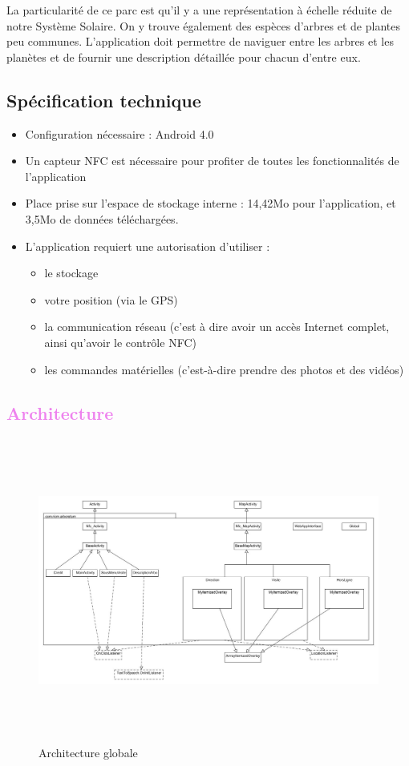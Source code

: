 \documentclass[a4paper,11pt]{article}
\begin{document}
    La particularité de ce parc est qu'il y a une représentation à échelle réduite de notre Système Solaire. On y trouve également des espèces d'arbres et de plantes
    peu communes. L'application doit permettre de naviguer entre les arbres et les planètes et de fournir une description détaillée pour chacun d'entre eux.
    \textcolor{NavyBlue}{\subsection{Spécification technique}}
      \begin{itemize}
       \item Configuration nécessaire : Android 4.0
       \item Un capteur NFC est nécessaire pour profiter de toutes les fonctionnalités de l'application
       \item Place prise sur l'espace de stockage interne : 14,42Mo pour l'application, et 3,5Mo de données téléchargées.
       \item L'application requiert une autorisation d'utiliser : 
     \begin{itemize}
      \item le stockage
      \item votre position (via le GPS)
      \item la communication réseau (c'est à dire avoir un accès Internet complet, ainsi qu'avoir le contrôle NFC)
      \item les commandes matérielles (c'est-à-dire prendre des photos et des vidéos)
     \end{itemize}
      \end{itemize}
\newpage
   \textcolor{Violet}{\section{Architecture}}
    \begin{figure}[H]
     \begin{center}
      \includegraphics[width=18cm,height=10cm]{archi.jpg}
      \caption{Architecture globale}
     \end{center}
    \end{figure}
\end{document}

